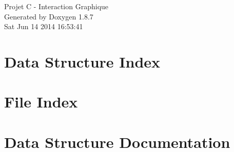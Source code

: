 \documentclass[twoside]{book}
\newcommand{\+}{\discretionary{\mbox{\scriptsize$\hookleftarrow$}}{}{}}
\newcommand{\clearemptydoublepage}{%
  \newpage{\pagestyle{empty}\cleardoublepage}%
}
\begin{document}
\hypersetup{pageanchor=false,
             bookmarks=true,
             bookmarksnumbered=true,
             pdfencoding=unicode
            }
\begin{titlepage}
\vspace*{7cm}
\begin{center}%
{\Large Projet C -\/ Interaction Graphique }\\
\vspace*{1cm}
{\large Generated by Doxygen 1.8.7}\\
\vspace*{0.5cm}
{\small Sat Jun 14 2014 16:53:41}\\
\end{center}
\end{titlepage}
\clearemptydoublepage
\tableofcontents
\clearemptydoublepage
{}
\hypersetup{pageanchor=true}

\chapter{Data Structure Index}

\chapter{File Index}

\chapter{Data Structure Documentation}





















\end{document}
